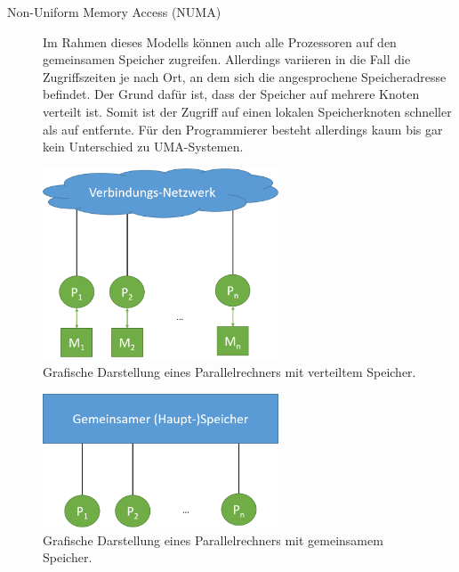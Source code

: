 \begin{description}
\begin{description}
							\item [Non-Uniform Memory Access (NUMA)]
								Im Rahmen dieses Modells können auch alle Prozessoren auf den gemeinsamen Speicher zugreifen. Allerdings variieren in die Fall die Zugriffszeiten je nach Ort, an dem sich die angesprochene Speicheradresse befindet. Der Grund dafür ist, dass der Speicher auf mehrere Knoten verteilt ist. Somit ist der Zugriff auf einen lokalen Speicherknoten schneller als auf entfernte. Für den Programmierer besteht allerdings kaum bis gar kein Unterschied zu UMA-Systemen. \cite{EntwicklungParallelerProgramme}
						\end{description}
				\end{description}
			
				\begin{figure}
					\centering	
					\includegraphics[width=7cm]{Abbildungen/Parallelrechner_mit_verteiltem_Speicher.png}
					\caption{Grafische Darstellung eines Parallelrechners mit verteiltem Speicher.}
					\label{fig:ParallelrechnerVerteilterSpeicher}
				\end{figure}
			
				\begin{figure}
					\centering	
					\includegraphics[width=7cm]{Abbildungen/Parallelrechner_mit_gemeinsamem_Speicher.png}
					\caption{Grafische Darstellung eines Parallelrechners mit gemeinsamem Speicher.}
					\label{fig:ParallelrechnerGemeinsamerSpeicher}
				\end{figure}
			
